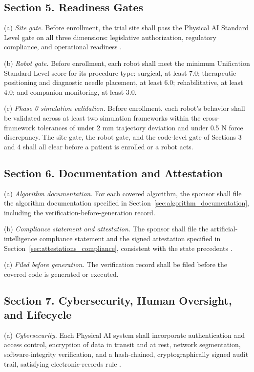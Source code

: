 \subsection{Section 5. Readiness Gates}

(a) \textit{Site gate.} Before enrollment, the trial site shall pass the Physical
AI Standard Level gate on all three dimensions: legislative authorization,
regulatory compliance, and operational readiness \cite{kawchak2026national}.

(b) \textit{Robot gate.} Before enrollment, each robot shall meet the minimum
Unification Standard Level score for its procedure type: surgical, at least 7.0;
therapeutic positioning and diagnostic needle placement, at least 6.0;
rehabilitative, at least 4.0; and companion monitoring, at least 3.0.

(c) \textit{Phase 0 simulation validation.} Before enrollment, each robot's
behavior shall be validated across at least two simulation frameworks within the
cross-framework tolerances of under 2 mm trajectory deviation and under 0.5 N
force discrepancy. The site gate, the robot gate, and the code-level gate of
Sections 3 and 4 shall all clear before a patient is enrolled or a robot acts.

\subsection{Section 6. Documentation and Attestation}

(a) \textit{Algorithm documentation.} For each covered algorithm, the sponsor
shall file the algorithm documentation specified in
Section~\ref{sec:algorithm_documentation}, including the
verification-before-generation record.

(b) \textit{Compliance statement and attestation.} The sponsor shall file the
artificial-intelligence compliance statement and the signed attestation specified
in Section~\ref{sec:attestations_compliance}, consistent with the state
precedents \cite{tx-sb1822, ny-a9149, ca-sb1120}.

(c) \textit{Filed before generation.} The verification record shall be filed
before the covered code is generated or executed.

\subsection{Section 7. Cybersecurity, Human Oversight, and Lifecycle}

(a) \textit{Cybersecurity.} Each Physical AI system shall incorporate
authentication and access control, encryption of data in transit and at rest,
network segmentation, software-integrity verification, and a hash-chained,
cryptographically signed audit trail, satisfying electronic-records rule
\cite{cfr-part11, kawchak2026mcp}.

